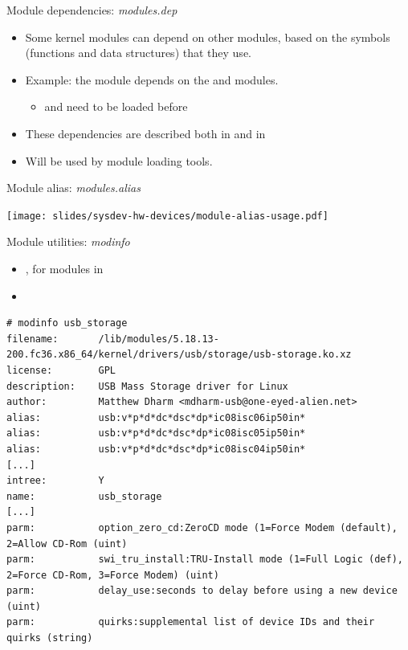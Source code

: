 \begin{frame}{Module dependencies: {\em modules.dep}}
  \begin{itemize}
  \item Some kernel modules can depend on other modules, based on the
    symbols (functions and data structures) that they use.
  \item Example: the  module depends on the  and
     modules.
    \begin{itemize}
    \item {} and  need to be loaded before 
    \end{itemize}
  \item These dependencies are described both in
     and in
  \item Will be used by module loading tools.
  \end{itemize}
\end{frame}

\begin{frame}{Module alias: {\em modules.alias}}
  \begin{center}
    \texttt{[image: slides/sysdev-hw-devices/module-alias-usage.pdf]}
  \end{center}
\end{frame}

\begin{frame}[fragile]{Module utilities: {\em modinfo}}
  \begin{itemize}
  \item {}, for modules in 
  \item {}
  \end{itemize}

  \begin{block}{}
    {\scriptsize
\begin{verbatim}
# modinfo usb_storage
filename:       /lib/modules/5.18.13-200.fc36.x86_64/kernel/drivers/usb/storage/usb-storage.ko.xz
license:        GPL
description:    USB Mass Storage driver for Linux
author:         Matthew Dharm <mdharm-usb@one-eyed-alien.net>
alias:          usb:v*p*d*dc*dsc*dp*ic08isc06ip50in*
alias:          usb:v*p*d*dc*dsc*dp*ic08isc05ip50in*
alias:          usb:v*p*d*dc*dsc*dp*ic08isc04ip50in*
[...]
intree:         Y
name:           usb_storage
[...]
parm:           option_zero_cd:ZeroCD mode (1=Force Modem (default), 2=Allow CD-Rom (uint)
parm:           swi_tru_install:TRU-Install mode (1=Full Logic (def), 2=Force CD-Rom, 3=Force Modem) (uint)
parm:           delay_use:seconds to delay before using a new device (uint)
parm:           quirks:supplemental list of device IDs and their quirks (string)
\end{verbatim}
    }
  \end{block}
\end{frame}

